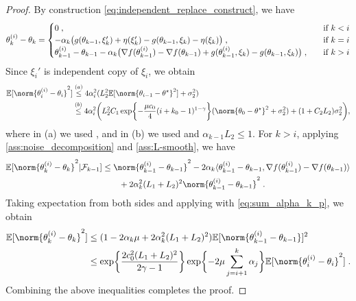 \begin{proof}
    By construction \eqref{eq:independent_replace_construct}, we have 
    \begin{equation}
    \theta_k^{(i)}-\theta_k = 
    \begin{cases}
     0\;, \quad &\text{if }k<i\\
      - \alpha_k\bigl(g(\theta_{k-1}, \xi_k')+\eta(\xi_k')-g(\theta_{k-1}, \xi_k)-\eta(\xi_k)\bigr)\;,\quad&\text{if }k=i\\
     \theta_{k-1}^{(i)}-\theta_{k-1}-\alpha_k\bigl(\nabla f(\theta_{k-1}^{(i)}) - \nabla f (\theta_{k-1}) +g(\theta_{k-1}^{(i)}, \xi_k)-g(\theta_{k-1}, \xi_k)\bigr) \;,\quad&\text{if }k>i\\
    \end{cases}
    \end{equation}
    Since $\xi_i'$ is independent copy of $\xi_i$, we obtain 
    \begin{align}
        \PE[\norm{\theta_i^{(i)}-\theta_i}^2] &\overset{(a)}{\leq} 4\alpha_i^2(L_2^2\PE[\norm{\theta_{i-1}-\thetas}^2] + \sigma_2^2) \\&\overset{(b)}{\leq} 4\alpha_i^2\biggl(L_2^2C_1\exp\biggl\{-\frac{\mu c_0}{4}(i+k_0-1)^{1-\gamma}\biggr\}(\norm{\theta_{0}-\thetas}^2 + \sigma_2^2) + (1+C_2L_2)\sigma_2^2
    \biggr),
    \end{align}
    where in (a) we used , and in (b) we used  and $\alpha_{k-1}L_2 \leq 1$.
    For $k>i$, applying \cref{ass:noise_decomposition} and \cref{ass:L-smooth}, we have 
    \begin{align}
         \PE [\norm{\theta_k^{(i)}-\theta_k}^2|\F_{k-1}] &\leq \norm{\theta_{k-1}^{(i)}-\theta_{k-1}}^2 -2\alpha_k\langle\theta_{k-1}^{(i)}-\theta_{k-1}, \nabla f(\theta_{k-1}^{(i)}) - \nabla f (\theta_{k-1}) \rangle \\&\qquad + 2\alpha_k^2(L_1+L_2)^2\norm{\theta_{k-1}^{(i)}-\theta_{k-1}}^2\eqsp.
    \end{align}
    Taking expectation from both sides and applying  with \ref{eq:sum_alpha_k_p}, we obtain  
    \begin{align}
        \PE [\norm{\theta_k^{(i)}-\theta_k}^2] &\leq (1-2\alpha_k\mu + 2\alpha_k^2(L_1+L_2)^2)\PE[\norm{\theta_{k-1}^{(i)}-\theta_{k-1}}]^2 \\&\leq \exp\biggl\{\frac{2c_0^2(L_1+L_2)^2}{2\gamma-1}\biggr\}\exp\biggl\{-2\mu\sum_{j=i+1}^{k}\alpha_j\biggr\}\PE[ \norm{\theta_i^{(i)}-\theta_i}^2]\eqsp.
    \end{align}
    Combining the above inequalities completes the proof.
\end{proof}

